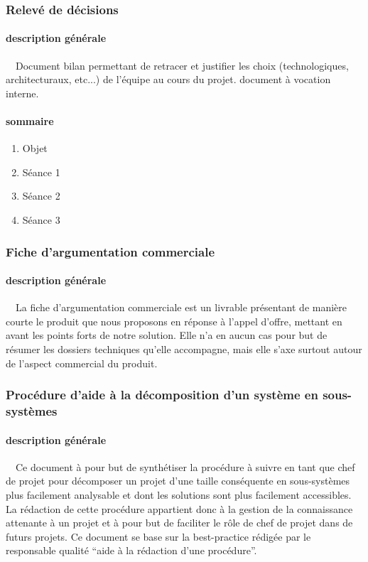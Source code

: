 \documentclass{article}
\begin{document}
\subsubsection[Relevé de décisions]{Relevé de décisions}
\paragraph[description générale]{description générale}
\ \ Document bilan permettant de retracer et justifier les choix
(technologiques, architecturaux, etc...) de l’équipe au cours du
projet. document à vocation interne.

\paragraph[sommaire]{sommaire}
\begin{enumerate}
\item Objet
\item Séance 1
\item Séance 2
\item Séance 3
\end{enumerate}
\subsubsection[Fiche d’argumentation commerciale]{Fiche d’argumentation
commerciale}
\paragraph[description générale]{description générale}
\ \ La fiche d’argumentation commerciale est un livrable présentant de
manière courte le produit que nous proposons en réponse à l’appel
d’offre, mettant en avant les points forts de notre solution. Elle n’a
en aucun cas pour but de résumer les dossiers techniques qu’elle
accompagne, mais elle s’axe surtout autour de l’aspect commercial du
produit.

\subsubsection[Procédure d’aide à la décomposition d’un système en
sous{}-systèmes]{Procédure d’aide à la décomposition d’un système en
sous-systèmes}
\paragraph[description générale]{description générale}
\ \ Ce document à pour but de synthétiser la procédure à suivre en tant
que chef de projet pour décomposer un projet d’une taille conséquente
en sous-systèmes plus facilement analysable et dont les solutions sont
plus facilement accessibles. La rédaction de cette procédure appartient
donc à la gestion de la connaissance attenante à un projet et à pour
but de faciliter le rôle de chef de projet dans de futurs projets. Ce
document se base sur la best-practice rédigée par le responsable
qualité “aide à la rédaction d’une procédure”.
\end{document}
